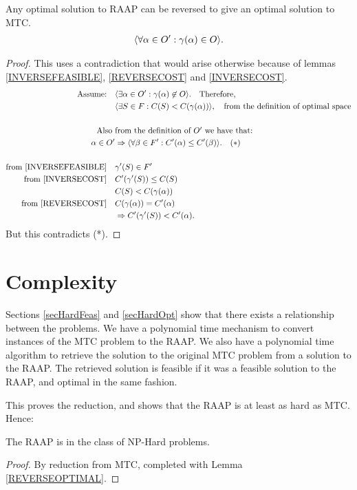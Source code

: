 \begin{lemma}
\label{REVERSEOPTIMAL}
Any optimal solution to RAAP can be reversed to give an optimal solution to MTC.
\begin{align}
	\nonumber \langle \forall \alpha \in O' : \gamma(\alpha) \in O \rangle .
\end{align}
\end{lemma}

\begin{proof}
This uses a contradiction that would arise otherwise because of lemmas \ref{INVERSEFEASIBLE}, \ref{REVERSECOST} and \ref{INVERSECOST}.
\begin{align}
	\nonumber \mbox{Assume:} \quad & \langle \exists \alpha \in O' : \gamma(\alpha) \not\in O \rangle . \quad \mbox{Therefore,}\\
	\nonumber & \langle \exists S \in F : C(S) < C(\gamma(\alpha)) \rangle , \quad \mbox{from the definition of optimal space} \\
	\nonumber \\
	\nonumber \mbox{Also } & \mbox{from the definition of $O'$ we have that:} \\
	\nonumber \alpha \in O' & \Rightarrow \langle \forall \beta \in F' : C'(\alpha) \leq C'(\beta) \rangle . \quad (*)\\
	\nonumber \\
	\nonumber \mbox{from \ref{INVERSEFEASIBLE}}\quad & \gamma'(S) \in F' \\
	\nonumber \mbox{from \ref{INVERSECOST}}\quad & C'(\gamma'(S)) \leq C(S) \\
	\nonumber & C(S) < C(\gamma(\alpha)) \\
	\nonumber \mbox{from \ref{REVERSECOST}}\quad & C(\gamma(\alpha)) = C'(\alpha)\\
	\nonumber & \Rightarrow C'(\gamma'(S)) < C'(\alpha).
\end{align}
But this contradicts (*).

\end{proof}

\section{Complexity}

Sections \ref{secHardFeas} and \ref{secHardOpt} show that there exists a relationship between the problems.
We have a polynomial time mechanism to convert instances of the MTC problem to the RAAP.
We also have a polynomial time algorithm to retrieve the solution to the original MTC problem from a solution to the RAAP.
The retrieved solution is feasible if it was a feasible solution to the RAAP, and optimal in the same fashion.

This proves the reduction, and shows that the RAAP is at least as hard as MTC.
Hence:
\begin{theorem}
The RAAP is in the class of NP-Hard problems.
\end{theorem}
\begin{proof}
By reduction from MTC, completed with Lemma \ref{REVERSEOPTIMAL}.
\end{proof}